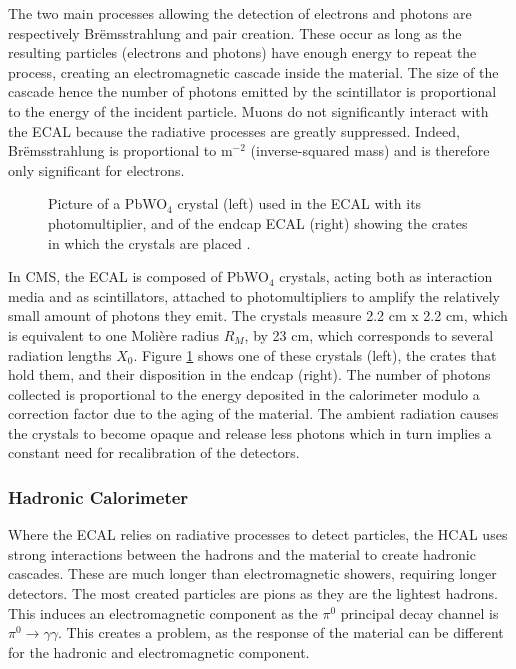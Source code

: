 				The two main processes allowing the detection of electrons and photons are respectively Brëmsstrahlung and pair creation. These occur as long as the resulting particles (electrons and photons) have enough energy to repeat the process, creating an electromagnetic cascade inside the material. The size of the cascade hence the number of photons emitted by the scintillator is proportional to the energy of the incident particle. Muons do not significantly interact with the ECAL because the radiative processes are greatly suppressed. Indeed, Brëmsstrahlung is proportional to m$ ^{-2} $ (inverse-squared mass) and is therefore only significant for electrons. \\

				\begin{figure}[h!]
					\centering
					\caption{Picture of a PbWO$ _4 $ crystal (left) used in the ECAL with its photomultiplier, and of the endcap ECAL (right) showing the crates in which the crystals are placed \Cite{CMS_at_LHC}.}
					\label{fig:lhc_and_cms__cms_ecal_view}
				\end{figure}

				In CMS, the ECAL is composed of PbWO$ _4 $ crystals, acting both as interaction media and as scintillators, attached to photomultipliers to amplify the relatively small amount of photons they emit. The crystals measure 2.2 cm x 2.2 cm, which is equivalent to one Molière radius $ R_M $, by 23 cm, which corresponds to several radiation lengths $ X_0 $. Figure \ref{fig:lhc_and_cms__cms_ecal_view} shows one of these crystals (left), the crates that hold them, and their disposition in the endcap (right). The number of photons collected is proportional to the energy deposited in the calorimeter modulo a correction factor due to the aging of the material. The ambient radiation causes the crystals to become opaque and release less photons which in turn implies a constant need for recalibration of the detectors.

			\subsubsection{Hadronic Calorimeter}
			\label{sec:lhc_and_cms__hadronic_calorimeter}

				Where the ECAL relies on radiative processes to detect particles, the HCAL uses strong interactions between the hadrons and the material to create hadronic cascades. These are much longer than electromagnetic showers, requiring longer detectors. The most created particles are pions as they are the lightest hadrons. This induces an electromagnetic component as the $ \pi^0 $ principal decay channel is $ \pi^0 \rightarrow \gamma \gamma $. This creates a problem, as the response of the material can be different for the hadronic and electromagnetic component. \\


